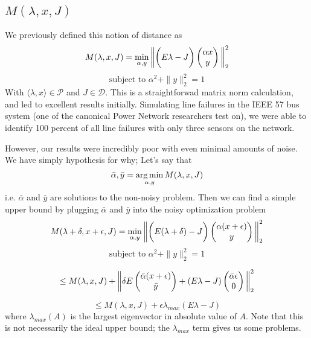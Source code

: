 \subsection{$M(\lambda, x, J)$}
We previously defined this notion of distance as
\begin{equation}
M(\lambda, x, J) = \min_{\alpha, y} \bigg{ \| } \bigg{(}E {\lambda} - J\bigg{)}
\begin{pmatrix}
\alpha x \\
y
\end{pmatrix}
     \bigg{ \| }_2^2
\end{equation}
$$ \text{subject to } \alpha^2 + \|y\|_2^2 = 1$$
 With 
$\langle \lambda,x \rangle \in \mathcal{P}$ and $J \in \mathcal{D}$. This is a straightforwad matrix norm calculation, and led to excellent results initially. Simulating line failures in the IEEE 57 bus system (one of the canonical Power Network researchers test on), we were able to identify 100 percent of all line failures with only three sensors on the network. 

However, our results were incredibly poor with even minimal amounts of noise. We have simply hypothesis for why; Let's say that $$\bar{\alpha}, \bar{y} = \operatorname*{arg\,min}_{\alpha,y} M(\lambda, x, J)$$ i.e. $\bar{\alpha}$ and $\bar{y}$ are solutions to the non-noisy problem. 
 Then we can find a simple upper bound by plugging $\bar{\alpha}$ and $\bar{y}$ into the noisy optimization problem
\begin{equation}
M(\lambda + \delta, x + \epsilon, J) = \min_{\alpha, y} \bigg{ \| } \bigg{(}E (\lambda + \delta) - J\bigg{)}
\begin{pmatrix}
\alpha (x + \epsilon) \\
y
\end{pmatrix}
     \bigg{ \| }_2^2
\end{equation}
$$ \text{subject to } \alpha^2 + \|y\|_2^2 = 1$$


$$\leq 
M(\lambda, x, J) + 
\bigg{\|} \delta E \begin{pmatrix}
\bar{\alpha} (x + \epsilon) \\
\bar{y}
\end{pmatrix} + (E {\lambda} - J )
\begin{pmatrix}
\bar{\alpha} \epsilon \\
0
\end{pmatrix}
\bigg{\|}_2^2
$$

$$ \leq M(\lambda, x, J) + \epsilon\lambda_{max}(E {\lambda} - J)$$ 
where $\lambda_{max}(A)$ is the largest eigenvector in absolute value of $A$. Note that this is not necessarily the ideal upper bound; the $\lambda_{max}$ term gives us some problems. 

